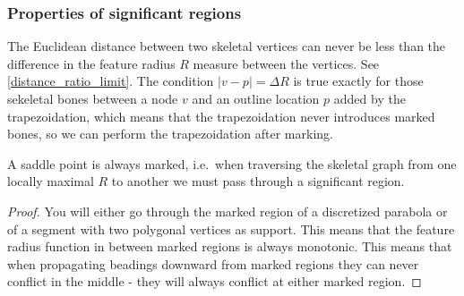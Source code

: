 \iffalse

\subsubsection{Properties of significant regions}
The Euclidean distance between two skeletal vertices can never be less than the difference in the feature radius $R$ measure between the vertices.
See \cref{distance_ratio_limit}.
The condition $|v - p| = \Delta R$ is true exactly for those sekeletal bones between a node $v$ and an outline location $p$ added by the trapezoidation, which means that the trapezoidation never introduces marked bones, so we can perform the trapezoidation after marking.

\begin{lemma}\label{saddle_points_are_marked}
A saddle point is always marked, i.e.\
when traversing the skeletal graph from one locally maximal $R$ to another we must pass through a significant region.
\end{lemma}
\begin{proof}
You will either go through the marked region of a discretized parabola or of a segment with two polygonal vertices as support.
This means that the feature radius function in between marked regions is always monotonic.
This means that when propagating beadings downward from marked regions they can never conflict in the middle - they will always conflict at either marked region.
\end{proof}

